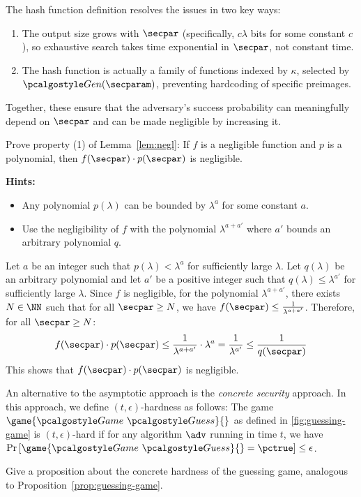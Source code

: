 \ifsolutions
\begin{mysolution}
  The hash function definition resolves the issues in two key ways:
  \begin{enumerate}
    \item The output size grows with $\secpar$ (specifically, $c\lambda$ bits for some constant $c$), so exhaustive search takes time exponential in $\secpar$, not constant time.
    \item The hash function is actually a family of functions indexed by $\kappa$, selected by $\algo{Gen}(\secparam)$, preventing hardcoding of specific preimages.
  \end{enumerate}
  Together, these ensure that the adversary's success probability can meaningfully depend on $\secpar$ and can be made negligible by increasing it.
\end{mysolution}
\fi

\begin{exercise}[Optional]\label{ex:negl-property-proof}
  Prove property (1) of Lemma~\ref{lem:negl}: If $f$ is a negligible function and $p$ is a polynomial, then $f(\secpar) \cdot p(\secpar)$ is negligible.
  
  \textbf{Hints:}
  \begin{itemize}
    \item Any polynomial $p(\lambda)$ can be bounded by $\lambda^{a}$ for some constant $a$.
    \item Use the negligibility of $f$ with the polynomial $\lambda^{a + a'}$ where $a'$ bounds an arbitrary polynomial $q$.
  \end{itemize}
\end{exercise}

\ifsolutions
\begin{mysolution}
  Let $a$ be an integer such that $p(\lambda) < \lambda^{a}$ for sufficiently large $\lambda$.
  Let $q(\lambda)$ be an arbitrary polynomial and let $a'$ be a positive integer such that $q(\lambda) \le \lambda^{a'}$ for sufficiently large $\lambda$.
  Since $f$ is negligible, for the polynomial $\lambda^{a + a'}$, there exists $N \in \NN$ such that for all $\secpar \ge N$, we have $f(\secpar) \le \frac{1}{\lambda^{a + a'}}$.
  Therefore, for all $\secpar \ge N$:
  \[
  f(\secpar) \cdot p(\secpar) \le \frac{1}{\lambda^{a + a'}} \cdot \lambda^{a} = \frac{1}{\lambda^{a'}} \le \frac{1}{q(\secpar)}
  \]
  This shows that $f(\secpar) \cdot p(\secpar)$ is negligible.
\end{mysolution}
\fi

\begin{exercise}[Optional]\label{ex:concrete-security}
  An alternative to the asymptotic approach is the \emph{concrete security} approach.
  In this approach, we define $(t,\epsilon)$-hardness as follows:
  The game $\game{\Game~\algo{Guess}}{}$ as defined in \autoref{fig:guessing-game} is $(t,\epsilon)$-hard if for any algorithm $\adv$ running in time $t$, we have $\pr{\game{\Game~\algo{Guess}}{} = \pctrue} \le \epsilon$.
  
  Give a proposition about the concrete hardness of the guessing game, analogous to Proposition~\ref{prop:guessing-game}.
\end{exercise}

